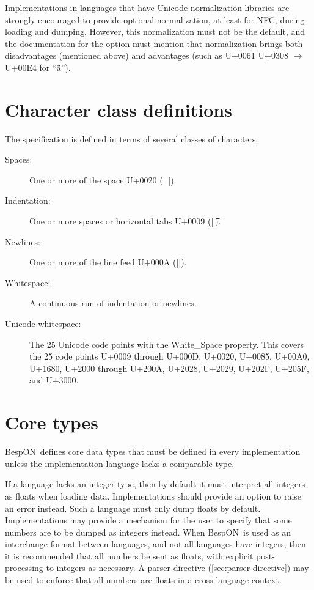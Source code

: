 \documentclass[11pt]{article}
\makeatletter
\newcommand{\bespon}{BespON}
\gdef\grammar@activate{%
  \expandafter\def\expandafter\@noligs\expandafter{%
    \@noligs
    \def'####1'{\textcolor{DarkBlue}{%
      \textquotesingle\booltrue{grammar@instring}####1\boolfalse{grammar@instring}\textquotesingle}}%
    \def"####1"{\textcolor{DarkBlue}{%
      \detokenize{"}\booltrue{grammar@instring}####1\boolfalse{grammar@instring}\detokenize{"}}}%
    \def={\ifbool{grammar@instring}%
       {\detokenize{=}}%
       {\textcolor{DarkRed}{\detokenize{=}}}}%
    \def+{\ifbool{grammar@instring}%
       {\detokenize{+}}%
       {\textcolor{DarkRed}{\detokenize{+}}}}%
    \def*{\ifbool{grammar@instring}%
       {\detokenize{*}}%
       {\textcolor{DarkRed}{\detokenize{*}}}}%
    \def|{\ifbool{grammar@instring}%
       {\detokenize{|}}%
       {\textcolor{DarkRed}{\detokenize{|}}}}%
    \def.{\ifbool{grammar@instring}%
       {\detokenize{.}}%
       {\textcolor{DarkRed}{\detokenize{.}}}}%
    \def({\ifbool{grammar@instring}%
       {\detokenize{(}}%
       {\textcolor{DarkRed}{\detokenize{(}}}}%
    \def){\ifbool{grammar@instring}%
       {\detokenize{)}}%
       {\textcolor{DarkRed}{\detokenize{)}}}}%
    \def[{\ifbool{grammar@instring}%
       {\detokenize{[}}%
       {\textcolor{DarkRed}{\detokenize{[}}}}%
    \def]{\ifbool{grammar@instring}%
       {\detokenize{]}}%
       {\textcolor{DarkRed}{\detokenize{]}}}}%
    \begingroup\lccode`\~=`\^^M\lowercase{\endgroup\def\grammar@comment####1~{\textcolor{DarkGray}{####1}~}}%
    \begingroup\lccode`\~=`\#\lowercase{\endgroup\def~}{%
       \ifbool{grammar@instring}%
        {\#}%
        {\textcolor{DarkGray}{\#}\grammar@comment}}%
  }%
}
\newenvironment{grammar}%
 {\VerbatimEnvironment
  \grammar@activate
  \begin{Verbatim}[formatcom=\color{DarkGreen},
  codes={ \catcode`\'=\active
          \catcode`\"=\active
          \catcode`\+=\active
          \catcode`\*=\active
          \catcode`\|=\active
          \catcode`\.=\active
          \catcode`\(=\active
          \catcode`\)=\active
          \catcode`\[=\active
          \catcode`\]=\active
          \catcode`\==\active}]}%
 {\end{Verbatim}}
\makeatother
\begin{document}
Implementations in languages that have Unicode normalization libraries are strongly encouraged to provide optional normalization, at least for NFC, during loading and dumping.  However, this normalization must not be the default, and the documentation for the option must mention that normalization brings both disadvantages (mentioned above) and advantages (such as U+0061 U+0308 $\rightarrow$ U+00E4 for ``\"{a}'').





\section{Character class definitions}
The specification is defined in terms of several classes of characters.
\begin{description}
\item[Spaces:]  One or more of the space U+0020 \begingroup{}(| |)\endgroup.
\item[Indentation:]  One or more spaces or horizontal tabs U+0009 (|\t|).
\item[Newlines:]  One or more of the line feed U+000A (|\n|).
\item[Whitespace:]  A continuous run of indentation or newlines.
\item[Unicode whitespace:]  The 25 Unicode code points with the White\_Space property.  This covers the 25 code points U+0009 through U+000D, U+0020, U+0085, U+00A0, U+1680, U+2000 through U+200A, U+2028, U+2029, U+202F, U+205F, and U+3000.
\end{description}






\section{Core types}

\bespon\ defines core data types that must be defined in every implementation unless the implementation language lacks a comparable type.

If a language lacks an integer type, then by default it must interpret all integers as floats when loading data.  Implementations should provide an option to raise an error instead.  Such a language must only dump floats by default.  Implementations may provide a mechanism for the user to specify that some numbers are to be dumped as integers instead.  When \bespon\ is used as an interchange format between languages, and not all languages have integers, then it is recommended that all numbers be sent as floats, with explicit post-processing to integers as necessary.  A parser directive (\cref{sec:parser-directive}) may be used to enforce that all numbers are floats in a cross-language context.
\end{document}
